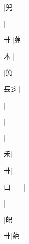 \begin{multicols}{2}
{{}|{\cjk{}兜}\par
{}|{}\par
{\cjk{}{\cnsym{}　}卄{\cnjzr{}}}|{\cjk{}蔸}\par
{\cjk{}{\cnsym{}　}木{\cnjzr{}}}|{}\par
{}|{\cjk{}篼}\par
{\cjk{}镸彡{\cnjzr{}}}|{}\par
{}|{}\par
{}|{}\par
{\cjk{}{\cnsym{}　}{\cnsym{}　}{\cnsym{}　}}|{}\par
{\cjk{}{\cnsym{}　}{\cnsym{}　}禾}|{}\par
{\cjk{}{\cnsym{}　}{\cnsym{}　}卄}|{}\par
{\cjk{}口{\cnsym{}　}{\cnsym{}　}}|{}\par
{\cjk{}{\cnsym{}　}{\cnsym{}　}{\cnsym{}　}}|{}\par
{\cjk{}{\cnsym{}　}{\cnsym{}　}{\cnsym{}　}}|{\cjk{}皅}\par
{\cjk{}{\cnsym{}　}{\cnsym{}　}卄}|{\cjk{}葩}\par
}
\end{multicols}
